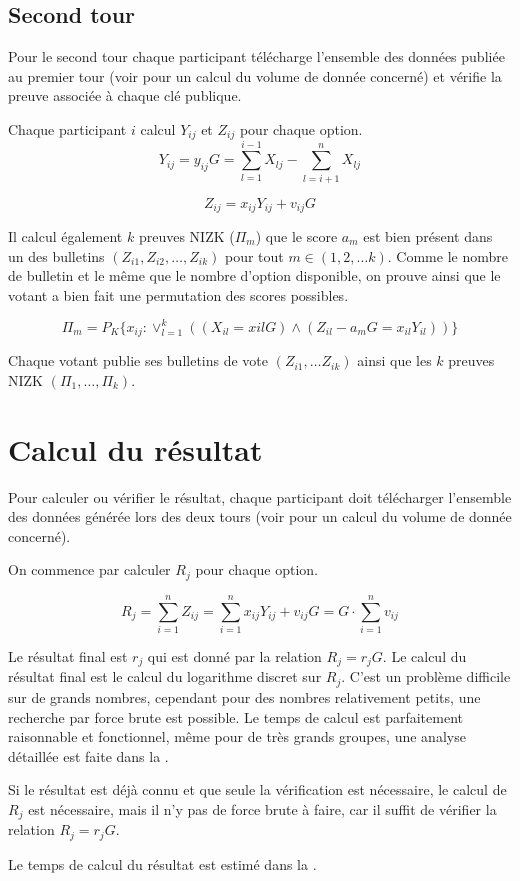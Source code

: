 \documentclass[../report]{subfiles}
\begin{document}
\subsection{Second tour}

Pour le second tour chaque participant télécharge l'ensemble des données publiée au premier 
tour (voir  pour un calcul du volume de donnée concerné) et vérifie la
preuve associée à chaque clé publique.

Chaque participant $i$ calcul $Y_{ij}$ et $Z_{ij}$ pour chaque option.
\[
	Y_{ij} = y_{ij} G = \sum_{l=1}^{i-1} X_{lj} - \sum_{l=i+1}^{n} X_{lj}
\]

\[
	Z_{ij} = x_{ij} Y_{ij} + v_{ij} G
\]

Il calcul également $k$ preuves NIZK ($\Pi_m$) que le score $a_{m}$ est bien présent dans un des bulletins 
$(Z_{i1}, Z_{i2}, \dots, Z_{ik})$ pour tout $m \in (1, 2, \dots k)$.
Comme le nombre de bulletin et le même que le nombre d'option disponible, on prouve ainsi
que le votant a bien fait une permutation des scores possibles.

\[
\Pi_m = P_K\{x_{ij}: \vee_{l=1}^{k} ((X_{il} = x{il} G) \wedge (Z_{il} - a_{m}G = x_{il} Y_{il}) )\}
\]

Chaque votant publie ses bulletins de vote $(Z_{i1}, \dots Z_{ik})$ ainsi que les $k$ preuves NIZK $(\Pi_1, \dots, \Pi_k)$.


\section{Calcul du résultat}\label{sec:res:proto:resultat}

Pour calculer ou vérifier le résultat, chaque participant doit télécharger l'ensemble des données générée lors des 
deux tours (voir  pour un calcul du volume de donnée concerné).

On commence par calculer $R_j$ pour chaque option.

\[
	R_j = \sum_{i=1}^{n} Z_{ij} = \sum_{i=1}^{n} x_{ij}Y_{ij} + v_{ij}G = G \cdot \sum_{i=1}^{n} v_{ij}
\]

Le résultat final est $r_j$ qui est donné par la relation $R_j = r_j G$.
Le calcul du résultat final est le calcul du logarithme discret sur $R_j$.
C'est un problème difficile sur de grands nombres, cependant pour des nombres 
relativement petits, une recherche par force brute est possible.
Le temps de calcul est parfaitement raisonnable et fonctionnel, même pour de très grands groupes, 
une analyse détaillée est faite dans la .

Si le résultat est déjà connu et que seule la vérification est nécessaire, le calcul de $R_j$ est nécessaire, mais il n'y
pas de force brute à faire, car il suffit de vérifier la relation $R_j = r_j G$.

Le temps de calcul du résultat est estimé dans la .
\end{document}
